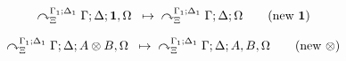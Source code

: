 
\begin{align}
\trans{\derstatex{\Gamma}{\Delta}{\Xi}{\Gamma_1}{\Delta_1}{\one, \Omega}}
{\derstatex{\Gamma}{\Delta}{\Xi}{\Gamma_1}{\Delta_1}{\Omega}}
\tag{new $\one$}
\end{align}

\begin{align}
\curvearrowright_{\Xi}^{\Gamma_1; \Delta_1} \Gamma; \Delta; A \otimes B, \Omega \;\; \mapsto \;\; \curvearrowright_{\Xi}^{\Gamma_1; \Delta_1} \Gamma; \Delta; A, B, \Omega
\tag{new $\otimes$}
\end{align}
